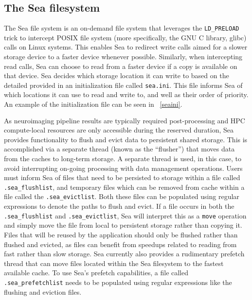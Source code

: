     \subsection{The Sea filesystem}
    
    The Sea file system is an on-demand file system that leverages the \texttt{LD\_PRELOAD} trick to intercept POSIX file system (more specifically, the GNU C library, glibc)
    calls on Linux systems. This enables Sea to redirect write calls aimed for a slower storage device to a faster device whenever
    possible. Similarly, when intercepting read calls, Sea can choose to read from a faster device if a copy is available on that device.
    Sea decides which storage location it can write to based on the detailed provided in an initialization file called \texttt{sea.ini}. 
    This file informs Sea of which locations it can use to read and write to, and well as their order of priority. An example of the initialization
    file can be seen in ~\ref{seaini}.
    
    As neuroimaging pipeline results are typically required post-processing and HPC compute-local resources are only accessible during the
    reserved duration, Sea provides functionality to flush and evict data to persistent shared storage. This is accomplished via a separate
    thread (known as the ``flusher'') that moves data from the caches  to long-term storage. A separate thread is used, in this case, to avoid
    interrupting on-going processing with data management operations.
    Users must inform Sea of files that need to be
    persisted to storage within a file called \texttt{.sea\_flushlist}, and temporary files which can be removed from cache within a file
    called the \texttt{.sea\_evictlist}. Both these files can be populated using regular expressions to denote the paths to flush and evict.
    If a file occurs in both the \texttt{.sea\_flushlist} and \texttt{.sea\_evictlist}, Sea will interpret this as a \texttt{move} operation
    and simply move the file from local to persistent storage rather than copying it. Files that will be reused by the application should only
    be flushed rather than flushed and evicted, as files can benefit from speedups related to reading from fast rather than slow storage.
    Sea currently also provides a rudimentary prefetch thread that can move files located within the Sea filesystem to the fastest available cache.
    To use Sea's prefetch capabilities, a file called \texttt{.sea\_prefetchlist} needs to be populated using regular expressions like the
    flushing and eviction files.
    
